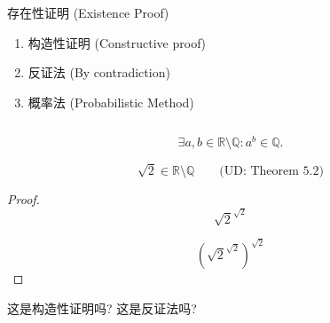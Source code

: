 \begin{frame}{}
  \begin{exampleblock}{存在性证明 (Existence Proof)}
    \begin{enumerate}
      \item 构造性证明 (Constructive proof)
      \item 反证法 (By contradiction)
	\pause
      \item 概率法 (Probabilistic Method)
    \end{enumerate}
  \end{exampleblock}

  \begin{columns}
      \pause
  \end{columns}
\end{frame}

\begin{frame}{}
  \begin{theorem}
    \[
      \exists a, b \in \mathbb{R} \setminus \mathbb{Q}: a^{b} \in \mathbb{Q}.
    \]
  \end{theorem}

  \pause
  \[
    \sqrt{2} \in \mathbb{R} \setminus \mathbb{Q} \qquad \text{(UD: Theorem 5.2)}
  \]

  \pause
  \begin{proof}
    \[
      \sqrt{2}^{\sqrt{2}}
    \]

    \pause
    \[
      (\sqrt{2}^{\sqrt{2}})^{\sqrt{2}}
    \]
  \end{proof}

  \vspace{0.50cm}
  \pause
  \centerline{ 这是构造性证明吗? \pause 这是反证法吗?}
\end{frame}
